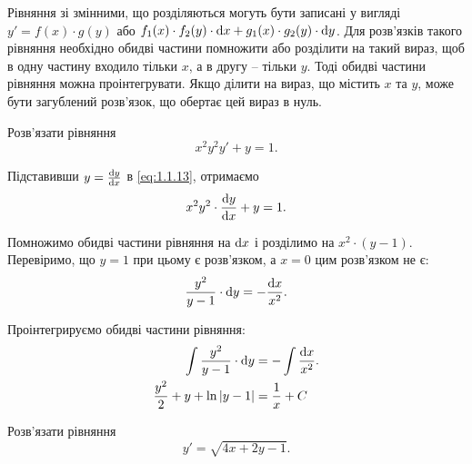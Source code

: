 Рівняння зі змінними, що розділяються могуть бути записані у вигляді $y' = f(x) \cdot g(y)$ або  $f_1(x) \cdot f_2(y) \cdot \mathop{}\!\mathrm{d} x + g_1(x) \cdot g_2(y) \cdot \mathop{}\!\mathrm{d} y$. Для розв’язків такого рівняння необхідно обидві частини помножити або розділити на такий вираз, щоб в одну частину входило тільки $x$, а в другу -- тільки $y$. Тоді обидві частини рівняння можна проінтегрувати.
Якщо ділити на вираз, що містить $x$ та $y$, може бути загублений розв’язок, що обертає цей вираз в нуль.

\begin{example}
	Розв’язати рівняння
	\begin{equation}
		\label{eq:1.1.13}
		x^2 y^2 y' + y = 1.
	\end{equation}
\end{example}

\begin{solution}
	Підставивши $y = \frac{\mathop{}\!\mathrm{d} y}{\mathop{}\!\mathrm{d} x}$ в \eqref{eq:1.1.13}, отримаємо 
	\begin{equation}
		\label{eq:1.1.14}
		x^2 y^2 \cdot \frac{\mathop{}\!\mathrm{d} y}{\mathop{}\!\mathrm{d} x} + y = 1.
	\end{equation}

	Помножимо обидві частини рівняння на $\mathop{}\!\mathrm{d} x$ і розділимо на $x^2 \cdot (y - 1)$. Перевіримо, що $y = 1$ при цьому є розв’язком, а $x = 0$ цим розв’язком не є:
	\begin{equation}
		\label{eq:1.1.15}
		\frac{y^2}{y - 1} \cdot \mathop{}\!\mathrm{d} y = - \frac{\mathop{}\!\mathrm{d} x}{x^2}.
	\end{equation}

	Проінтегрируємо обидві частини рівняння:
	\begin{align}
		\label{eq:1.1.16}
		\int \frac{y^2}{y - 1} \cdot \mathop{}\!\mathrm{d} y &= - \int \frac{\mathop{}\!\mathrm{d} x}{x^2}. \\
		\frac{y^2}{2} + y + \ln |y - 1| &= \frac{1}{x} + C
	\end{align}
\end{solution}

\begin{example}
	Розв’язати рівняння
	\begin{equation}
		\label{eq:1.1.17}
		y' = \sqrt{4x + 2y - 1}.
	\end{equation}
\end{example}

